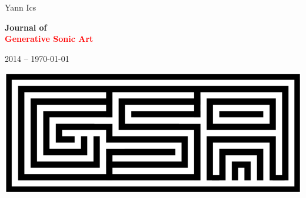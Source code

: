 \documentclass{book}
\begin{document}
\pagecolor{aureolin!30}
\begin{titlepage} %

	\raggedleft %
	
	\vspace*{\baselineskip} %
	
	{\huge  \textsf{Yann Ics}} %
	
	\vspace*{0.167\textheight} %
	
	\textbf{\LARGE Journal of}\\[\baselineskip] %
	
	{\textcolor{Red}{\Huge \textbf{Generative Sonic Art}}}\\[\baselineskip] %
	
	\vspace{4mm} 
	
	{\Large \textsf{2014 -- \today}} %
	
	\vfill %
	
	{\includegraphics[scale=0.09]{img/4563}}

	\vspace*{3\baselineskip} %

\end{titlepage}
\pagecolor{white}

\renewcommand{\chaptermark}[1]{ \markboth{#1}{} }
\renewcommand{\sectionmark}[1]{ \markright{Generative Sonic Art} }



\tableofcontents

{\let\clearpage\relax\listofalgorithms}
\thispagestyle{empty}

{\let\cleardoublepage\clearpage \listoffigures}
\end{document}
